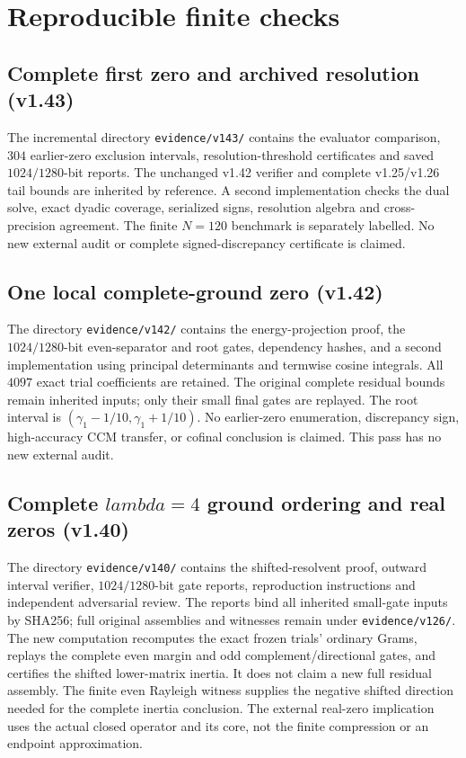 \documentclass[11pt]{article}
\def\lambda{lambda}%
\theoremstyle{remark}
\begin{document}
\appendix
\section{Reproducible finite checks}\label{app:numerics}

\subsection{Complete first zero and archived resolution (v1.43)}
The incremental directory \texttt{evidence/v143/} contains the evaluator
comparison, $304$ earlier-zero exclusion intervals, resolution-threshold
certificates and saved $1024/1280$-bit reports. The unchanged v1.42
verifier and complete v1.25/v1.26 tail bounds are inherited by reference.
A second implementation checks the dual solve, exact dyadic coverage,
serialized signs, resolution algebra and cross-precision agreement.
The finite $N=120$ benchmark is separately labelled. No new external
audit or complete signed-discrepancy certificate is claimed.

\subsection{One local complete-ground zero (v1.42)}
The directory \texttt{evidence/v142/} contains the energy-projection
proof, the $1024/1280$-bit even-separator and root gates, dependency
hashes, and a second implementation using principal determinants and
termwise cosine integrals. All $4097$ exact trial coefficients are
retained. The original complete residual bounds remain inherited
inputs; only their small final gates are replayed. The root interval
is $(\gamma_1-1/10,\gamma_1+1/10)$. No earlier-zero enumeration,
discrepancy sign, high-accuracy CCM transfer, or cofinal conclusion
is claimed. This pass has no new external audit.

\subsection{Complete \texorpdfstring{$\lambda=4$}{lambda=4} ground ordering and real zeros (v1.40)}
The directory \texttt{evidence/v140/} contains the shifted-resolvent
proof, outward interval verifier, $1024/1280$-bit gate reports,
reproduction instructions and independent adversarial review.
The reports bind all inherited small-gate inputs by SHA256; full
original assemblies and witnesses remain under \texttt{evidence/v126/}.
The new computation recomputes the exact frozen trials' ordinary Grams,
replays the complete even margin and odd complement/directional gates,
and certifies the shifted lower-matrix inertia. It does not claim a new
full residual assembly. The finite even Rayleigh witness supplies the
negative shifted direction needed for the complete inertia conclusion.
The external real-zero implication uses the actual closed operator and
its core, not the finite compression or an endpoint approximation.
\end{document}
